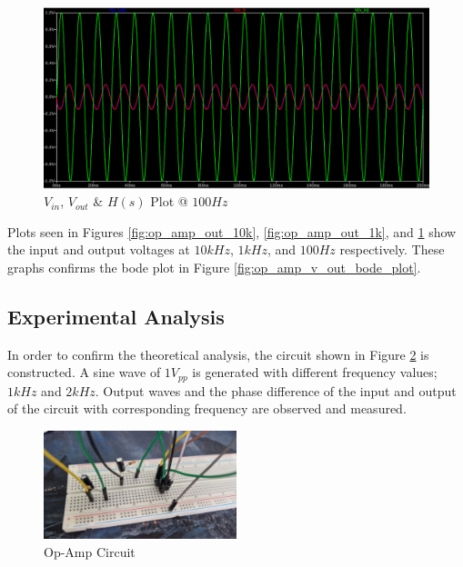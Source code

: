 \newpage
\thispagestyle{plain}

\begin{figure}[h]
    \centering
    \includegraphics[width=1\textwidth]{assets/opamp-100.png}
    \caption{$V_{in}$, $V_{out}$ \& $H(s)$ Plot @ $100Hz$}
    \label{fig:op_amp_out_100}
\end{figure}

Plots seen in Figures \ref{fig:op_amp_out_10k}, \ref{fig:op_amp_out_1k}, and \ref{fig:op_amp_out_100} show the input and output voltages at $10kHz$, $1kHz$, and $100Hz$ respectively. These graphs confirms the bode plot in Figure \ref{fig:op_amp_v_out_bode_plot}.

\newpage
\thispagestyle{plain}

\subsection{Experimental Analysis}

In order to confirm the theoretical analysis, the circuit shown in Figure \ref{fig:q2-circ} is constructed. A sine wave of $1V_{pp}$ is generated with different frequency values; $1kHz$ and $2kHz$. Output waves and the phase difference of the input and output of the circuit with corresponding frequency are observed and measured.

\begin{figure}[h]
    \centering
    \includegraphics[width=0.5\textwidth]{assets/exp/q2-circ.jpeg}
    \caption{Op-Amp Circuit}
    \label{fig:q2-circ}
\end{figure}

